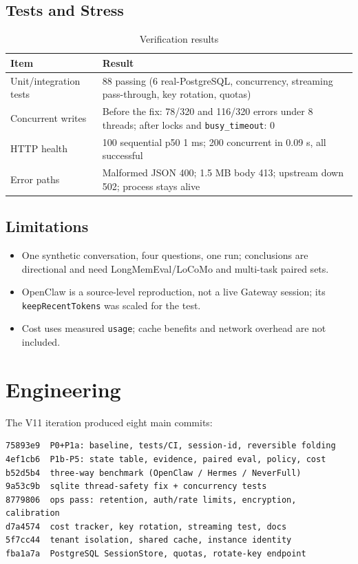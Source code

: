 \documentclass[11pt,a4paper]{article}
\begin{document}
\subsection{Tests and Stress}
\begin{table}[htbp]
\centering
\caption{Verification results}
\begin{tabularx}{\linewidth}{lX}
\toprule
Item & Result \\
\midrule
Unit/integration tests & 88 passing (6 real-PostgreSQL, concurrency, streaming pass-through, key rotation, quotas) \\
Concurrent writes & Before the fix: 78/320 and 116/320 errors under 8 threads; after locks and \texttt{busy\_timeout}: 0 \\
HTTP health & 100 sequential p50 1 ms; 200 concurrent in 0.09 s, all successful \\
Error paths & Malformed JSON 400; 1.5 MB body 413; upstream down 502; process stays alive \\
\bottomrule
\end{tabularx}
\end{table}

\subsection{Limitations}
\begin{itemize}
  \item One synthetic conversation, four questions, one run; conclusions are directional and need LongMemEval/LoCoMo and multi-task paired sets.
  \item OpenClaw is a source-level reproduction, not a live Gateway session; its \texttt{keepRecentTokens} was scaled for the test.
  \item Cost uses measured \texttt{usage}; cache benefits and network overhead are not included.
\end{itemize}

\section{Engineering}

The V11 iteration produced eight main commits:
\begin{lstlisting}
75893e9  P0+P1a: baseline, tests/CI, session-id, reversible folding
4ef1cb6  P1b-P5: state table, evidence, paired eval, policy, cost
b52d5b4  three-way benchmark (OpenClaw / Hermes / NeverFull)
9a53c9b  sqlite thread-safety fix + concurrency tests
8779806  ops pass: retention, auth/rate limits, encryption, calibration
d7a4574  cost tracker, key rotation, streaming test, docs
5f7cc44  tenant isolation, shared cache, instance identity
fba1a7a  PostgreSQL SessionStore, quotas, rotate-key endpoint
\end{lstlisting}
\end{document}
